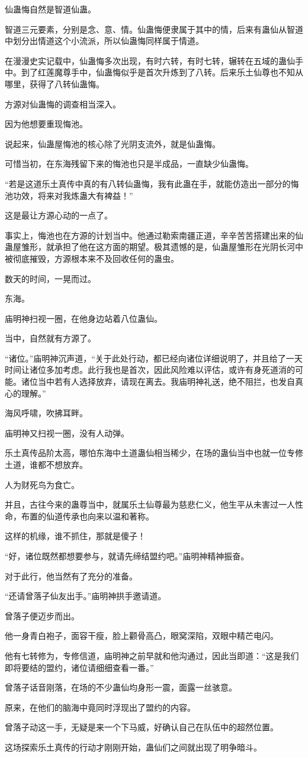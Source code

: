 \begin{this_body}
仙蛊悔自然是智道仙蛊。

智道三元要素，分别是念、意、情。仙蛊悔便隶属于其中的情，后来有蛊仙从智道中划分出情道这个小流派，所以仙蛊悔同样属于情道。

在漫漫史实记载中，仙蛊悔多次出现，有时六转，有时七转，辗转在五域的蛊仙手中。到了红莲魔尊手中，仙蛊悔似乎是首次升炼到了八转。后来乐土仙尊也不知从哪里，获得了八转仙蛊悔。

方源对仙蛊悔的调查相当深入。

因为他想要重现悔池。

说起来，仙蛊屋悔池的核心除了光阴支流外，就是仙蛊悔。

可惜当初，在东海残留下来的悔池也只是半成品，一直缺少仙蛊悔。

“若是这道乐土真传中真的有八转仙蛊悔，我有此蛊在手，就能仿造出一部分的悔池功效，将来对我炼蛊大有裨益！”

这是最让方源心动的一点了。

事实上，悔池也在方源的计划当中。他通过勒索南疆正道，辛辛苦苦搭建出来的仙蛊屋雏形，就承担了他在这方面的期望。极其遗憾的是，仙蛊屋雏形在光阴长河中被彻底摧毁，方源根本来不及回收任何的蛊虫。

数天的时间，一晃而过。

东海。

庙明神扫视一圈，在他身边站着八位蛊仙。

当中，自然就有方源了。

“诸位。”庙明神沉声道，“关于此处行动，都已经向诸位详细说明了，并且给了一天时间让诸位多加考虑。此行我也是首次，因此风险难以评估，或许有身死道消的可能。诸位当中若有人选择放弃，请现在离去。我庙明神礼送，绝不阻拦，也发自真心的理解。”

海风呼啸，吹拂耳畔。

庙明神又扫视一圈，没有人动弹。

乐土真传品阶太高，哪怕东海中土道蛊仙相当稀少，在场的蛊仙当中也就一位专修土道，谁都不想放弃。

人为财死鸟为食亡。

并且，古往今来的蛊尊当中，就属乐土仙尊最为慈悲仁义，他生平从未害过一人性命，布置的仙道传承也向来以温和著称。

这样的机缘，谁不抓住，那就是傻子！

“好，诸位既然都想要参与，就请先缔结盟约吧。”庙明神精神振奋。

对于此行，他当然有了充分的准备。

“还请曾落子仙友出手。”庙明神拱手邀请道。

曾落子便迈步而出。

他一身青白袍子，面容干瘦，脸上颧骨高凸，眼窝深陷，双眼中精芒电闪。

他有七转修为，专修信道，庙明神之前早就和他沟通过，因此当即道：“这是我们即将要结的盟约，诸位请细细查看一番。”

曾落子话音刚落，在场的不少蛊仙均身形一震，面露一丝骇意。

原来，在他们的脑海中竟同时浮现出了盟约的内容。

曾落子动这一手，无疑是来一个下马威，好确认自己在队伍中的超然位置。

这场探索乐土真传的行动才刚刚开始，蛊仙们之间就出现了明争暗斗。

\end{this_body}


